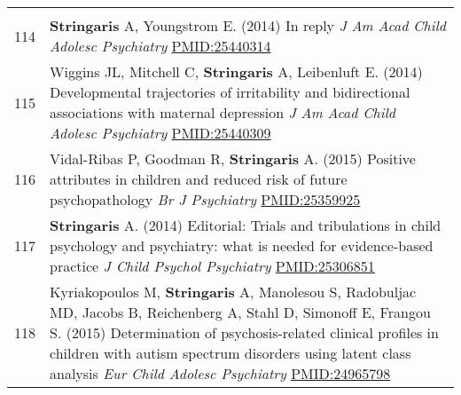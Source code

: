 \documentclass[
]{article}
\begin{document}
\begin{longtable}[]{@{}ll@{}}
\begin{minipage}[t]{0.94\columnwidth}
\end{minipage}\tabularnewline
\begin{minipage}[t]{0.01\columnwidth}\raggedright
114\strut
\end{minipage} & \begin{minipage}[t]{0.94\columnwidth}\raggedright
\textbf{Stringaris} A, Youngstrom E. (2014) In reply \emph{J Am Acad
Child Adolesc Psychiatry} \url{PMID:25440314}\strut
\end{minipage}\tabularnewline
\begin{minipage}[t]{0.01\columnwidth}\raggedright
115\strut
\end{minipage} & \begin{minipage}[t]{0.94\columnwidth}\raggedright
Wiggins JL, Mitchell C, \textbf{Stringaris} A, Leibenluft E. (2014)
Developmental trajectories of irritability and bidirectional
associations with maternal depression \emph{J Am Acad Child Adolesc
Psychiatry} \url{PMID:25440309}\strut
\end{minipage}\tabularnewline
\begin{minipage}[t]{0.01\columnwidth}\raggedright
116\strut
\end{minipage} & \begin{minipage}[t]{0.94\columnwidth}\raggedright
Vidal-Ribas P, Goodman R, \textbf{Stringaris} A. (2015) Positive
attributes in children and reduced risk of future psychopathology
\emph{Br J Psychiatry} \url{PMID:25359925}\strut
\end{minipage}\tabularnewline
\begin{minipage}[t]{0.01\columnwidth}\raggedright
117\strut
\end{minipage} & \begin{minipage}[t]{0.94\columnwidth}\raggedright
\textbf{Stringaris} A. (2014) Editorial: Trials and tribulations in
child psychology and psychiatry: what is needed for evidence-based
practice \emph{J Child Psychol Psychiatry} \url{PMID:25306851}\strut
\end{minipage}\tabularnewline
\begin{minipage}[t]{0.01\columnwidth}\raggedright
118\strut
\end{minipage} & \begin{minipage}[t]{0.94\columnwidth}\raggedright
Kyriakopoulos M, \textbf{Stringaris} A, Manolesou S, Radobuljac MD,
Jacobs B, Reichenberg A, Stahl D, Simonoff E, Frangou S. (2015)
Determination of psychosis-related clinical profiles in children with
autism spectrum disorders using latent class analysis \emph{Eur Child
Adolesc Psychiatry} \url{PMID:24965798}\strut

\end{minipage}
\end{longtable}
\end{document}
